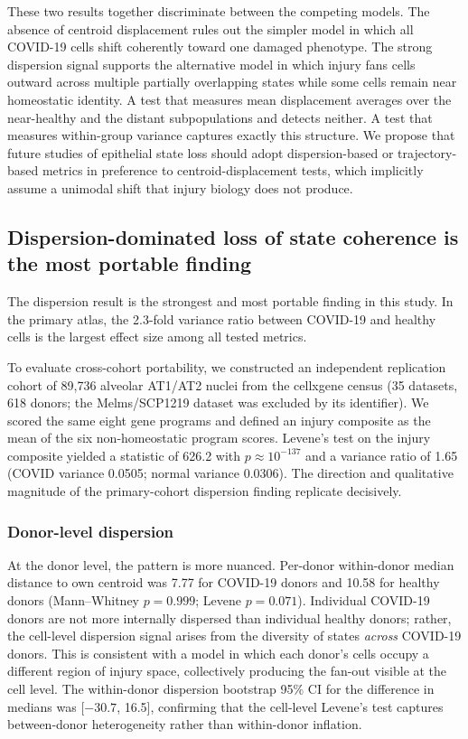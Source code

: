 \documentclass[11pt,a4paper]{article}
\begin{document}
These two results together discriminate between the competing models. The absence
of centroid displacement rules out the simpler model in which all COVID-19 cells
shift coherently toward one damaged phenotype. The strong dispersion signal
supports the alternative model in which injury fans cells outward across multiple
partially overlapping states while some cells remain near homeostatic identity. A
test that measures mean displacement averages over the near-healthy and the
distant subpopulations and detects neither. A test that measures within-group
variance captures exactly this structure. We propose that future studies of
epithelial state loss should adopt dispersion-based or trajectory-based metrics in
preference to centroid-displacement tests, which implicitly assume a unimodal
shift that injury biology does not produce.

\subsection{Dispersion-dominated loss of state coherence is the most portable finding}

The dispersion result is the strongest and most portable finding in this study. In
the primary atlas, the 2.3-fold variance ratio between COVID-19 and healthy cells
is the largest effect size among all tested metrics.

To evaluate cross-cohort portability, we constructed an independent replication
cohort of 89,736 alveolar AT1/AT2 nuclei from the cellxgene census (35 datasets,
618 donors; the Melms/SCP1219 dataset was excluded by its identifier). We scored
the same eight gene programs and defined an injury composite as the mean of the
six non-homeostatic program scores. Levene's test on the injury composite yielded
a statistic of 626.2 with $p \approx 10^{-137}$ and a variance ratio of 1.65
(COVID variance 0.0505; normal variance 0.0306). The direction and qualitative
magnitude of the primary-cohort dispersion finding replicate decisively.

\subsubsection{Donor-level dispersion}

At the donor level, the pattern is more nuanced. Per-donor within-donor median
distance to own centroid was 7.77 for COVID-19 donors and 10.58 for healthy
donors (Mann--Whitney $p = 0.999$; Levene $p = 0.071$). Individual COVID-19
donors are not more internally dispersed than individual healthy donors; rather,
the cell-level dispersion signal arises from the diversity of states \textit{across}
COVID-19 donors. This is consistent with a model in which each donor's cells
occupy a different region of injury space, collectively producing the fan-out
visible at the cell level. The within-donor dispersion bootstrap 95\% CI for the
difference in medians was [$-30.7$, 16.5], confirming that the cell-level Levene's
test captures between-donor heterogeneity rather than within-donor inflation.
\end{document}
